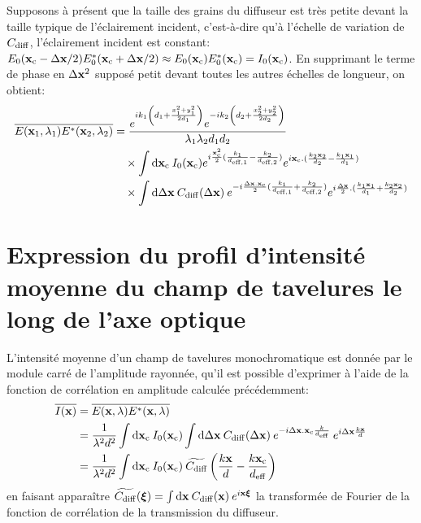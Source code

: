 Supposons à présent que la taille des grains du diffuseur est très petite devant la taille typique de l'éclairement incident, c'est-à-dire qu'à l'échelle de variation de $C_{\mathrm{diff}}$, l'éclairement incident est constant: $E_0(\mathbf{x}_{\mathrm{c}}-\Delta\mathbf{x}/2) E_0^*(\mathbf{x}_{\mathrm{c}}+\Delta\mathbf{x}/2) \approx E_0(\mathbf{x}_{\mathrm{c}}) E_0^*(\mathbf{x}_{\mathrm{c}}) = I_0(\mathbf{x}_{\mathrm{c}})$. En supprimant le terme de phase en $\Delta\mathbf{x}^2$ supposé petit devant toutes les autres échelles de longueur, on obtient:
\begin{align}
\overline{E(\mathbf{x}_1,\lambda_1)E^*(\mathbf{x}_2,\lambda_2)} &= \frac{e^{ik_1\left( d_1 + \frac{x_1^2+y_1^2}{2d_1} \right)} e^{-ik_2 \left( d_2 + \frac{x_2^2+y_2^2}{2d_2}\right)}}{\lambda_1 \lambda_2 d_1 d_2} \\
\nonumber & \quad \times \int{\mathop{}\mathopen{}\mathrm{d}\mathbf{x}_{\mathrm{c}}\: I_0(\mathbf{x}_{\mathrm{c}}) e^{i\frac{\mathbf{x}_{\mathrm{c}}^2}{2}(\frac{k_1}{d_{\mathrm{eff,1}}} - \frac{k_2}{d_{\mathrm{eff,2}}})} e^{i \mathbf{x}_{\mathrm{c}}. (\frac{k_2 \mathbf{x}_2}{d_2}-\frac{k_1 \mathbf{x}_1}{d_1})}} \\
\nonumber & \quad \times \int{\mathop{}\mathopen{}\mathrm{d}\Delta\mathbf{x}\: C_{\mathrm{diff}}(\Delta\mathbf{x}) \: e^{-i\frac{\Delta\mathbf{x}. \mathbf{x}_{\mathrm{c}}}{2}(\frac{k_1}{d_{\mathrm{eff,1}}} + \frac{k_2}{d_{\mathrm{eff,2}}})} e^{i\frac{\Delta\mathbf{x}}{2}. (\frac{k_1 \mathbf{x}_1}{d_1} +\frac{k_2 \mathbf{x}_2}{d_2})}}
\end{align}

\section{Expression du profil d'intensité moyenne du champ de tavelures le long de l'axe optique}
L'intensité moyenne d'un champ de tavelures monochromatique est donnée par le module carré de l'amplitude rayonnée, qu'il est possible d'exprimer à l'aide de la fonction de corrélation en amplitude calculée précédemment:
\begin{align}
\overline{I(\mathbf{x})} &= \overline{E(\mathbf{x},\lambda) E^*(\mathbf{x},\lambda)} \\
&= \frac{1}{\lambda^2 d^2} \int{\mathop{}\mathopen{}\mathrm{d}\mathbf{x}_{\mathrm{c}}\: I_0(\mathbf{x}_{\mathrm{c}}) \int{\mathop{}\mathopen{}\mathrm{d}\Delta\mathbf{x}\: C_{\mathrm{diff}}(\Delta\mathbf{x}) \: e^{-i \Delta\mathbf{x}. \mathbf{x}_{\mathrm{c}}\frac{k}{d_{\mathrm{eff}}}} \: e^{i\Delta\mathbf{x}\frac{k \mathbf{x}}{d}}}} \\
&= \frac{1}{\lambda^2 d^2} \int{\mathop{}\mathopen{}\mathrm{d}\mathbf{x}_{\mathrm{c}}\: I_0(\mathbf{x}_{\mathrm{c}}) \: \widetilde{C_{\mathrm{diff}}}\left(\frac{k\mathbf{x}}{d} - \frac{k\mathbf{x}_{\mathrm{c}}}{d_{\mathrm{eff}}}\right)}
\end{align}
en faisant apparaître $\widetilde{C_{\mathrm{diff}}}(\boldsymbol{\xi})= \int{\mathop{}\mathopen{}\mathrm{d}\mathbf{x} \: C_{\mathrm{diff}}(\mathbf{x}) \: e^{i\mathbf{x}\boldsymbol{\xi}}}$ la transformée de Fourier de la fonction de corrélation de la transmission du diffuseur.

